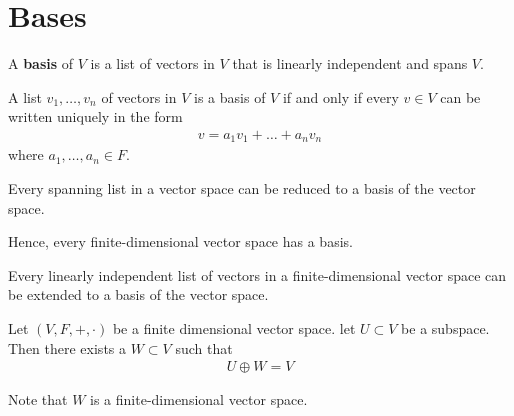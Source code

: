 \documentclass{memoir}
\begin{document}
\section{Bases}
\begin{defn}[Basis]
A \textbf{basis} of $V$ is a list of vectors in $V$ that is linearly independent and spans $V$.
\end{defn}
\begin{lemma}
	A list $v_1,\ldots,v_n$ of vectors in $V$ is a basis of $V$ if and only if every $v \in V$ can be written uniquely in the form
	\begin{align*}
		v = a_1v_1+\ldots+a_nv_n
	\end{align*}
	where $a_1,\ldots,a_n \in F$.
\end{lemma}
\begin{thm}
	Every spanning list in a vector space can be reduced to a basis of the vector space.
\end{thm}
	Hence, every finite-dimensional vector space has a basis.
\begin{cor}
	Every linearly independent list of vectors in a finite-dimensional vector space can be extended to a basis of the vector space.	
\end{cor}

\begin{thm}
	Let $(V,F,+,\cdot )$ be a finite dimensional vector space. let $U\subset V$ be a subspace. Then there exists a $ W \subset V$ such that
	\begin{align*}
	U \oplus W = V
	\end{align*}
\end{thm}
Note that \(W\) is a finite-dimensional vector space.
\end{document}
